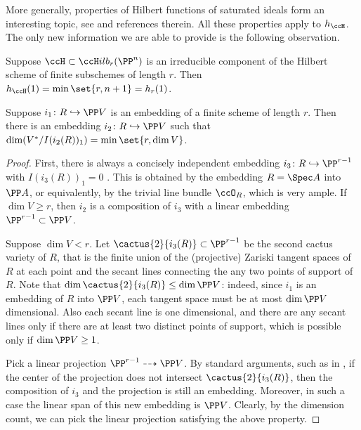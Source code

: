 \documentclass[12pt,a4paper]{article}
\newcommand{\usualHilb}{{\ccH}ilb}
\begin{document}
More generally, properties of Hilbert functions of saturated ideals form an interesting topic,
see \cite{ablett_Gotzmann_persistence_for_smooth_projective_toric_varieties} and references therein.
All these properties apply to $h_{\ccH}$.
The only new information we are able to provide is the following observation.

\begin{prop}\label{prop_genhilbfunc}
   Suppose $\ccH\subset \usualHilb_r(\PP^n)$ is an irreducible component of the
      Hilbert scheme of finite subschemes of length $r$.
   Then $h_{\ccH}(1) = \min\set{r, n+1} = h_r(1)$.
\end{prop}




\begin{lemma}\label{lem_nondeg_embedding}
   Suppose $i_1\colon R \hookrightarrow \PP V$ is an embedding of a finite scheme of length $r$.
   Then there is an embedding $i_2\colon R \hookrightarrow \PP V$
     such that $\dim (V^*/I(i_2(R))_1) = \min\set{r, \dim V}$.
\end{lemma}

\begin{proof}
   First, there is always a concisely independent embedding
   $i_3\colon R \hookrightarrow \PP^{r-1}$
   with $I(i_3(R))_1 = 0$
   \cite[pp~702--703]{nisiabu_jabu_kleppe_teitler_direct_sums}.
   This is obtained by the embedding $R = \Spec A$ into $\PP A$,
     or equivalently, by the trivial line bundle $\ccO_R$, which is very ample.
   If $\dim V\ge r$, then $i_2$ is a composition of $i_3$ with a linear embedding $\PP^{r-1} \subset \PP V$.

   Suppose $\dim V < r$.
   Let $\cactus{2}{i_3(R)}\subset \PP^{r-1}$ be the second cactus variety of $R$,
   that is the finite union of the (projective) Zariski tangent spaces of $R$ at each point and the secant lines connecting the any two points of support of $R$.
   Note that $\dim \cactus{2}{i_3(R)} \le \dim \PP V$:
   indeed, since $i_1$ is an embedding of $R$ into $\PP V$,
   each tangent space must be at most $\dim \PP V$ dimensional.
   Also each secant line is one dimensional, and there are any secant lines only if there are at least two distinct points of support,
   which is possible only if $\dim \PP V\ge 1$.

   Pick a linear projection $\PP^{r-1}\dashrightarrow \PP V$.
   By standard arguments, such as in \cite[Prop.~IV.3.4]{hartshorne},
      if the center of the projection does not intersect
      $\cactus{2}{i_3(R)}$,
      then the composition of $i_3$ and the projection is still an embedding.
   Moreover, in such a case the linear span of this new embedding is $\PP V$.
   Clearly, by the dimension count, we can pick the linear projection satisfying the above property.
\end{proof}
\end{document}
